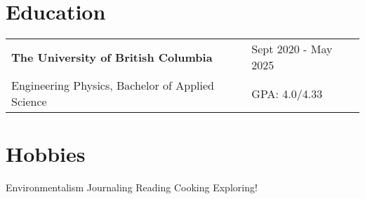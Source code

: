 \documentclass[a4paper,12pt]{article}
\begin{document}
\section{Education}
\begin{tabularx}{\linewidth}{@{}l X@{}}	 
\textbf{The University of British Columbia} & \hfill Sept 2020 - May 2025 \\
Engineering Physics, Bachelor of Applied Science &  \hfill \normalsize GPA: 4.0/4.33 \\
\end{tabularx}

\section{Hobbies}
\begin{center}{\linewidth}
Environmentalism \hfill   Journaling \hfill   Reading \hfill    Cooking   \hfill  Exploring!\\
\end{center}

\vfill
{}
\end{document}
